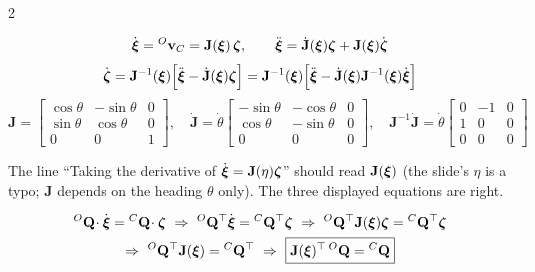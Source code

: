 \begin{multicols}{2}
\begin{fbx}
\[\dot{\boldsymbol\xi}={}^O\mathbf v_C=\mathbf J(\boldsymbol\xi)\,\boldsymbol\zeta,\qquad \ddot{\boldsymbol\xi}=\dot{\mathbf J}(\boldsymbol\xi)\boldsymbol\zeta+\mathbf J(\boldsymbol\xi)\dot{\boldsymbol\zeta}\]
\[\dot{\boldsymbol\zeta}=\mathbf J^{-1}(\boldsymbol\xi)\Big[\ddot{\boldsymbol\xi}-\dot{\mathbf J}(\boldsymbol\xi)\boldsymbol\zeta\Big]=\mathbf J^{-1}(\boldsymbol\xi)\Big[\ddot{\boldsymbol\xi}-\dot{\mathbf J}(\boldsymbol\xi)\mathbf J^{-1}(\boldsymbol\xi)\dot{\boldsymbol\xi}\Big]\]
\[\mathbf J=\begin{bmatrix}\cos\theta&-\sin\theta&0\\\sin\theta&\cos\theta&0\\0&0&1\end{bmatrix},\quad\dot{\mathbf J}=\dot\theta\begin{bmatrix}-\sin\theta&-\cos\theta&0\\\cos\theta&-\sin\theta&0\\0&0&0\end{bmatrix},\quad \mathbf J^{-1}\dot{\mathbf J}=\dot\theta\begin{bmatrix}0&-1&0\\1&0&0\\0&0&0\end{bmatrix}\]
\end{fbx}
\begin{slideerr}
The line ``Taking the derivative of $\dot{\boldsymbol\xi}=\mathbf J(\eta)\boldsymbol\zeta$'' should read $\mathbf J(\boldsymbol\xi)$ (the slide's $\eta$ is a typo; $\mathbf J$ depends on the heading $\theta$ only). The three displayed equations are right.
\end{slideerr}
\columnbreak
{}
\begin{fbx}[$\wEQC=\mathbf J^\top\wEQO$ \pg{32}]
\begin{gather*}\wEQO\!\cdot\dot{\wEx}=\wEQC\!\cdot\wEz\ \Rightarrow\ \wEQO^{\top}\dot{\wEx}=\wEQC^{\top}\wEz\ \Rightarrow\ \wEQO^{\top}\mathbf J(\wEx)\wEz=\wEQC^{\top}\wEz\\ \Rightarrow\ \wEQO^{\top}\mathbf J(\wEx)=\wEQC^{\top}\ \Rightarrow\ \boxed{\mathbf J(\wEx)^{\top}\,\wEQO=\wEQC}\end{gather*}

\end{fbx}
\end{multicols}
